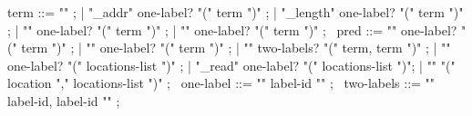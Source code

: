 \begin{syntax}
  term ::= "\null" ;
        | "\base_addr" one-label? "(" term ")" ;
        | "\block_length" one-label? "(" term ")" ;
        | "\offset" one-label?  "(" term ")" ;
        | { "\allocation" } one-label?   "(" term ")" ;
       \
  pred ::=  "\allocable" one-label? "(" term ")" ;
       |  "\freeable" one-label? "(" term ")" ;
       | "\fresh"   two-labels? "(" term, term ")" ;
       | "\valid"  one-label?  "(" locations-list ")" ;
       | "\valid_read"  one-label? "(" locations-list ")";
       | "\separated" "(" location "," locations-list ")" ;
       \
  one-label ::= "{" label-id "}" ;
       \
  two-labels ::= "{" label-id, label-id "}" ;
\end{syntax}

